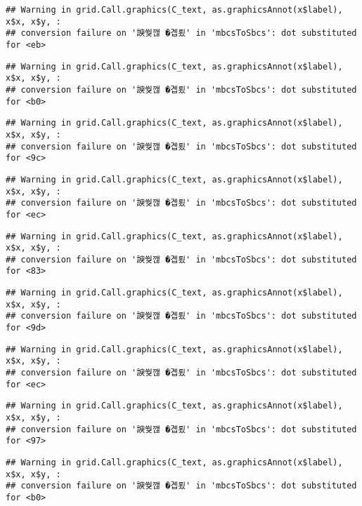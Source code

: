 \documentclass[
]{article}
\begin{document}
\begin{verbatim}
## Warning in grid.Call.graphics(C_text, as.graphicsAnnot(x$label), x$x, x$y, :
## conversion failure on '諛쒖깮 �곕룄' in 'mbcsToSbcs': dot substituted for <eb>
\end{verbatim}

\begin{verbatim}
## Warning in grid.Call.graphics(C_text, as.graphicsAnnot(x$label), x$x, x$y, :
## conversion failure on '諛쒖깮 �곕룄' in 'mbcsToSbcs': dot substituted for <b0>
\end{verbatim}

\begin{verbatim}
## Warning in grid.Call.graphics(C_text, as.graphicsAnnot(x$label), x$x, x$y, :
## conversion failure on '諛쒖깮 �곕룄' in 'mbcsToSbcs': dot substituted for <9c>
\end{verbatim}

\begin{verbatim}
## Warning in grid.Call.graphics(C_text, as.graphicsAnnot(x$label), x$x, x$y, :
## conversion failure on '諛쒖깮 �곕룄' in 'mbcsToSbcs': dot substituted for <ec>
\end{verbatim}

\begin{verbatim}
## Warning in grid.Call.graphics(C_text, as.graphicsAnnot(x$label), x$x, x$y, :
## conversion failure on '諛쒖깮 �곕룄' in 'mbcsToSbcs': dot substituted for <83>
\end{verbatim}

\begin{verbatim}
## Warning in grid.Call.graphics(C_text, as.graphicsAnnot(x$label), x$x, x$y, :
## conversion failure on '諛쒖깮 �곕룄' in 'mbcsToSbcs': dot substituted for <9d>
\end{verbatim}

\begin{verbatim}
## Warning in grid.Call.graphics(C_text, as.graphicsAnnot(x$label), x$x, x$y, :
## conversion failure on '諛쒖깮 �곕룄' in 'mbcsToSbcs': dot substituted for <ec>
\end{verbatim}

\begin{verbatim}
## Warning in grid.Call.graphics(C_text, as.graphicsAnnot(x$label), x$x, x$y, :
## conversion failure on '諛쒖깮 �곕룄' in 'mbcsToSbcs': dot substituted for <97>
\end{verbatim}

\begin{verbatim}
## Warning in grid.Call.graphics(C_text, as.graphicsAnnot(x$label), x$x, x$y, :
## conversion failure on '諛쒖깮 �곕룄' in 'mbcsToSbcs': dot substituted for <b0>
\end{verbatim}
\end{document}
